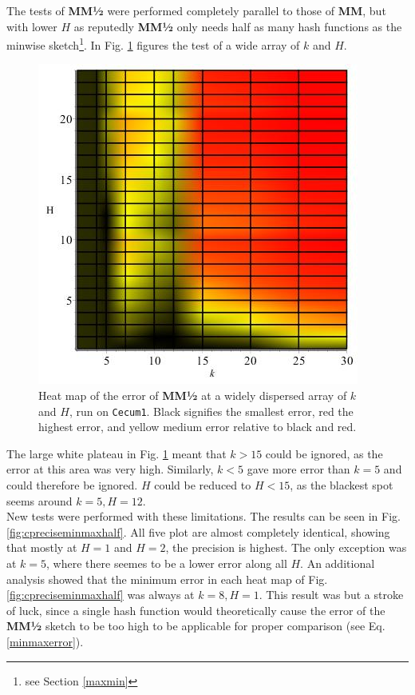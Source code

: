 \documentclass[../../main.tex]{subfiles}
\begin{document}
The tests of {\bf MM½} were performed completely parallel to those of {\bf MM}, but with lower $H$ as reputedly {\bf MM½} only needs half as many hash functions as the minwise sketch\footnote{see Section \ref{maxmin}}. In Fig. \ref{fig:wiseCminmaxhalf} figures the test of a wide array of $k$ and $H$.
\begin{figure}[H]
\centering
\includegraphics[scale=0.5]{precision/minmaxhalf/cecum1wide.jpg}
\caption{Heat map of the error of {\bf MM½} at a widely dispersed array of $k$ and $H$, run on \texttt{Cecum1}. Black signifies the smallest error, red the highest error, and yellow medium error relative to black and red.}\label{fig:wiseCminmaxhalf}
\end{figure}

The large white plateau in Fig. \ref{fig:wiseCminmaxhalf} meant that $k>15$ could be ignored, as the error at this area was very high. Similarly, $k<5$ gave more error than $k=5$ and could therefore be ignored. $H$ could be reduced to $H< 15$, as the blackest spot seems around $k=5,H=12$.\\

New tests were performed with these limitations. The results can be seen in Fig. \ref{fig:cpreciseminmaxhalf}. All five plot are almost completely identical, showing that mostly at $H=1$ and $H=2$, the precision is highest. The only exception was at $k=5$, where there seemes to be a lower error along all $H$. An additional analysis showed that the minimum error in each heat map of Fig. \ref{fig:cpreciseminmaxhalf} was always at $k=8, H=1$. This result was but a stroke of luck, since a single hash function would theoretically cause the error of the {\bf MM½} sketch to be too high to be applicable for proper comparison (see Eq. \ref{minmaxerror}).\\
\end{document}
